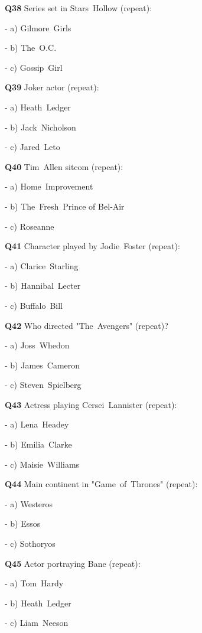 \textbf{Q38} Series set in Stars Hollow (repeat):\par
\quad - a) Gilmore Girls\par
\quad - b) The O.C.\par
\quad - c) Gossip Girl\par

\textbf{Q39} Joker actor (repeat):\par
\quad - a) Heath Ledger\par
\quad - b) Jack Nicholson\par
\quad - c) Jared Leto\par

\textbf{Q40} Tim Allen sitcom (repeat):\par
\quad - a) Home Improvement\par
\quad - b) The Fresh Prince of Bel‑Air\par
\quad - c) Roseanne\par

\textbf{Q41} Character played by Jodie Foster (repeat):\par
\quad - a) Clarice Starling\par
\quad - b) Hannibal Lecter\par
\quad - c) Buffalo Bill\par

\textbf{Q42} Who directed "The Avengers" (repeat)?\par
\quad - a) Joss Whedon\par
\quad - b) James Cameron\par
\quad - c) Steven Spielberg\par

\textbf{Q43} Actress playing Cersei Lannister (repeat):\par
\quad - a) Lena Headey\par
\quad - b) Emilia Clarke\par
\quad - c) Maisie Williams\par

\textbf{Q44} Main continent in "Game of Thrones" (repeat):\par
\quad - a) Westeros\par
\quad - b) Essos\par
\quad - c) Sothoryos\par

\textbf{Q45} Actor portraying Bane (repeat):\par
\quad - a) Tom Hardy\par
\quad - b) Heath Ledger\par
\quad - c) Liam Neeson\par

